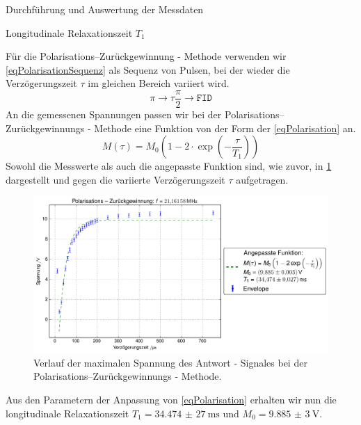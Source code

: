 \documentclass[pdftex, a4paper,11pt, twoside, ngerman]{report}
\begin{document}
\begin{chapter}{Durchführung und Auswertung der Messdaten}
\begin{section}{
        Longitudinale Relaxationszeit $T_{1}$}
\begin{subsection}
        Für die Polarisations--Zurückgewinnung - Methode verwenden wir
        \cref{eqPolarisationSequenz} als Sequenz von Pulsen, bei der wieder die
        Verzögerungszeit $\tau$ im gleichen Bereich variiert wird.
        \begin{equation}
          \label{eqPolarisationSequenz}
          \pi \rightarrow \tau \frac{\pi}{2} \rightarrow \mathtt{FID}
        \end{equation}
        An die gemessenen Spannungen passen wir bei der Polarisations--
        Zurückgewinnungs - Methode eine Funktion von der Form der
        \cref{eqPolarisation} an.
        \begin{equation}
          \label{eqPolarisation}
          M(\tau)=M_{0}\left(1-2\cdot\exp\left(-\frac{\tau}{T_{1}}\right)\right)
        \end{equation}
        Sowohl die Messwerte als auch die angepasste Funktion sind, wie zuvor,
        in \cref{figPolarisation} dargestellt und gegen die variierte
        Verzögerungszeit $\tau$ aufgetragen.
        \begin{figure}[htb]
          \centering
          \includegraphics[width=\textwidth]
          {Figures/PolarisationsZurueckgewinnung.png}
          \caption{Verlauf der maximalen Spannung des Antwort - Signales bei der
            Polarisations--Zurückgewinnungs - Methode.}
          \label{figPolarisation}
        \end{figure}
        
        Aus den Parametern der Anpassung von \cref{eqPolarisation} erhalten
        wir nun die longitudinale Relaxationszeit
        $T_{1}=\SI{34,474(27)}{\milli\second}$ und $M_{0}=\SI{9,885(3)}{\volt}$.
        
      \end{subsection}
      

\end{section}
\end{chapter}
\end{document}
